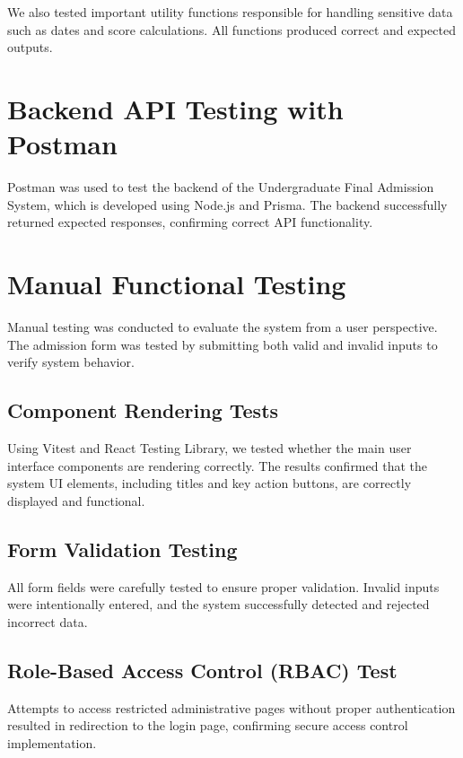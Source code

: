 We also tested important utility functions responsible for handling sensitive data such as dates and score calculations. All functions produced correct and expected outputs.

\section{Backend API Testing with Postman}

Postman was used to test the backend of the Undergraduate Final Admission System, which is developed using Node.js and Prisma. The backend successfully returned expected responses, confirming correct API functionality.

\section{Manual Functional Testing}

Manual testing was conducted to evaluate the system from a user perspective. The admission form was tested by submitting both valid and invalid inputs to verify system behavior. 

\subsection{Component Rendering Tests}

Using Vitest and React Testing Library, we tested whether the main user interface components are rendering correctly. The results confirmed that the system UI elements, including titles and key action buttons, are correctly displayed and functional.

\subsection{Form Validation Testing}

All form fields were carefully tested to ensure proper validation. Invalid inputs were intentionally entered, and the system successfully detected and rejected incorrect data.

\subsection{Role-Based Access Control (RBAC) Test}

Attempts to access restricted administrative pages without proper authentication resulted in redirection to the login page, confirming secure access control implementation.

